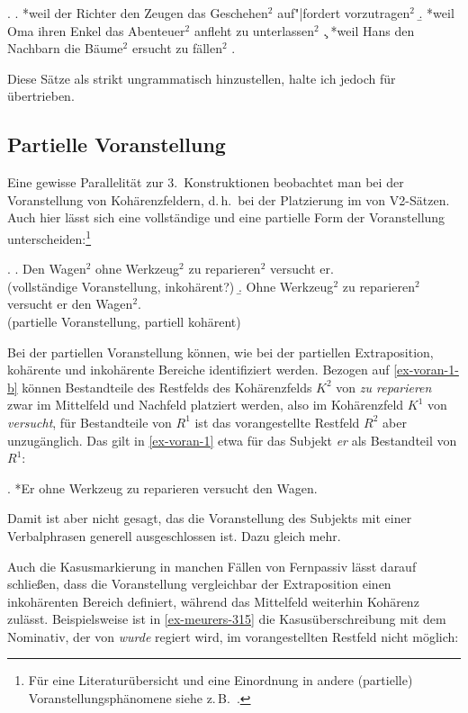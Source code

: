 \ex. 
\a. *weil der Richter den Zeugen das Geschehen$^2$ auf"|fordert vorzutragen$^2$
\b. *weil Oma ihren Enkel das Abenteuer$^2$ anfleht zu unterlassen$^2$
\c. *weil Hans den Nachbarn die Bäume$^2$ ersucht zu fällen$^2$ 
\z. \citep[(32)]{Grosse:05}

Diese Sätze als strikt ungrammatisch hinzustellen, halte ich jedoch für übertrieben.



\subsection{Partielle Voranstellung} \label{sec-kohaerenz-voran}
 
Eine gewisse Parallelität zur 3.~Konstruktionen beobachtet man bei der Voranstellung von Kohärenzfeldern, d.\,h.\ bei der Platzierung im  von V2-Sätzen. 
Auch hier lässt sich eine vollständige und eine partielle Form der Voranstellung unterscheiden:\footnote{Für eine Literaturübersicht und eine Einordnung in andere (partielle) Voranstellungsphänomene siehe z.\,B.\ \citet[Kapitel~9]{Meurers:99}.}

\ex. \label{ex-voran-1}
\a. Den Wagen$^2$ ohne Werkzeug$^2$ zu reparieren$^2$ versucht er. \\
(vollständige Voranstellung, inkohärent?)
\b. Ohne Werkzeug$^2$ zu reparieren$^2$ versucht er den Wagen$^2$. \\
(partielle Voranstellung, partiell kohärent)\label{ex-voran-1-b}

Bei der partiellen Voranstellung können, wie bei der partiellen Extraposition, kohärente und inkohärente Bereiche identifiziert werden. Bezogen auf \ref{ex-voran-1-b} können Bestandteile des Restfelds des Kohärenzfelds $K^2$ von {\it zu reparieren} zwar im Mittelfeld und Nachfeld platziert werden, also im Kohärenzfeld $K^1$ von {\it versucht}, für Bestandteile von $R^1$ ist das vorangestellte Restfeld $R^2$ aber unzugänglich. Das gilt in \ref{ex-voran-1} etwa für das Subjekt \textit{er} als Bestandteil von $R^1$:

\ex. *Er ohne Werkzeug zu reparieren versucht den Wagen. \label{ex-voran}    

Damit ist aber nicht gesagt, das die Voranstellung des Subjekts mit einer Verbalphrasen generell ausgeschlossen ist. Dazu gleich mehr.

Auch die Kasusmarkierung in manchen Fällen von Fernpassiv lässt darauf schlie\-ßen, dass die Voranstellung vergleichbar der Extraposition einen inkohärenten Bereich definiert, während das Mittelfeld weiterhin Kohärenz zulässt. Beispielsweise ist in \ref{ex-meurers-315} die Kasusüberschreibung mit dem Nominativ, der von {\it wurde} regiert wird, im vorangestellten Restfeld nicht möglich: 
  
